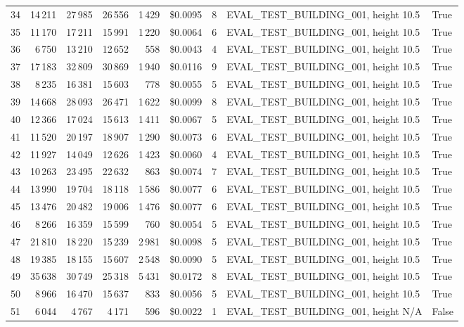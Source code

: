 \documentclass[a4paper,11pt]{article}
\begin{document}
\begin{table}[ht]
\begin{tabular}{r r r r r r r p{3cm} l}
34 & 14\,211 & 27\,985 & 26\,556 & 1\,429 & \$0.0095 & 8 & EVAL\_TEST\_BUILDING\_001, height 10.5 & True \\
35 & 11\,170 & 17\,211 & 15\,991 & 1\,220 & \$0.0064 & 6 & EVAL\_TEST\_BUILDING\_001, height 10.5 & True \\
36 & 6\,750 & 13\,210 & 12\,652 & 558 & \$0.0043 & 4 & EVAL\_TEST\_BUILDING\_001, height 10.5 & True \\
37 & 17\,183 & 32\,809 & 30\,869 & 1\,940 & \$0.0116 & 9 & EVAL\_TEST\_BUILDING\_001, height 10.5 & True \\
38 & 8\,235 & 16\,381 & 15\,603 & 778 & \$0.0055 & 5 & EVAL\_TEST\_BUILDING\_001, height 10.5 & True \\
39 & 14\,668 & 28\,093 & 26\,471 & 1\,622 & \$0.0099 & 8 & EVAL\_TEST\_BUILDING\_001, height 10.5 & True \\
40 & 12\,366 & 17\,024 & 15\,613 & 1\,411 & \$0.0067 & 5 & EVAL\_TEST\_BUILDING\_001, height 10.5 & True \\
41 & 11\,520 & 20\,197 & 18\,907 & 1\,290 & \$0.0073 & 6 & EVAL\_TEST\_BUILDING\_001, height 10.5 & True \\
42 & 11\,927 & 14\,049 & 12\,626 & 1\,423 & \$0.0060 & 4 & EVAL\_TEST\_BUILDING\_001, height 10.5 & True \\
43 & 10\,263 & 23\,495 & 22\,632 & 863 & \$0.0074 & 7 & EVAL\_TEST\_BUILDING\_001, height 10.5 & True \\
44 & 13\,990 & 19\,704 & 18\,118 & 1\,586 & \$0.0077 & 6 & EVAL\_TEST\_BUILDING\_001, height 10.5 & True \\
45 & 13\,476 & 20\,482 & 19\,006 & 1\,476 & \$0.0077 & 6 & EVAL\_TEST\_BUILDING\_001, height 10.5 & True \\
46 & 8\,266 & 16\,359 & 15\,599 & 760 & \$0.0054 & 5 & EVAL\_TEST\_BUILDING\_001, height 10.5 & True \\
47 & 21\,810 & 18\,220 & 15\,239 & 2\,981 & \$0.0098 & 5 & EVAL\_TEST\_BUILDING\_001, height 10.5 & True \\
48 & 19\,385 & 18\,155 & 15\,607 & 2\,548 & \$0.0090 & 5 & EVAL\_TEST\_BUILDING\_001, height 10.5 & True \\
49 & 35\,638 & 30\,749 & 25\,318 & 5\,431 & \$0.0172 & 8 & EVAL\_TEST\_BUILDING\_001, height 10.5 & True \\
50 & 8\,966 & 16\,470 & 15\,637 & 833 & \$0.0056 & 5 & EVAL\_TEST\_BUILDING\_001, height 10.5 & True \\
51 & 6\,044 & 4\,767 & 4\,171 & 596 & \$0.0022 & 1 & EVAL\_TEST\_BUILDING\_001, height N/A & False \\

\end{tabular}
\end{table}
\end{document}
